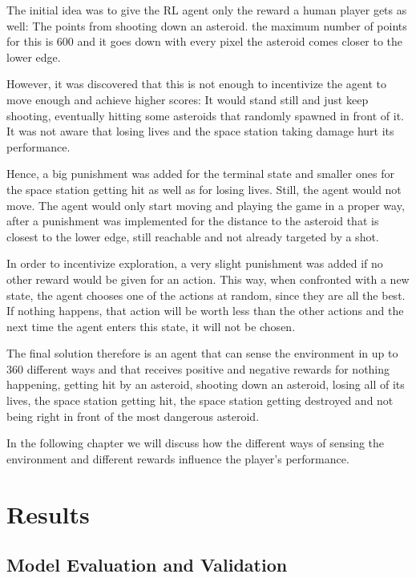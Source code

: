 \documentclass[a4paper,10pt]{article}
\begin{document}
The initial idea was to give the RL agent only the reward a human player gets as well: The points from shooting down an asteroid.
the maximum number of points for this is 600 and it goes down with every pixel the asteroid comes closer to the lower edge.

However, it was discovered that this is not enough to incentivize the agent to move enough and achieve higher scores: It would stand still and just keep shooting, eventually hitting some asteroids that randomly spawned in front of it.
It was not aware that losing lives and the space station taking damage hurt its performance.

Hence, a big punishment was added for the terminal state and smaller ones for the space station getting hit as well as for losing lives.
Still, the agent would not move.
The agent would only start moving and playing the game in a proper way, after a punishment was implemented for the distance to the asteroid that is closest to the lower edge, still reachable and not already targeted by a shot.

In order to incentivize exploration, a very slight punishment was added if no other reward would be given for an action.
This way, when confronted with a new state, the agent chooses one of the actions at random, since they are all the best.
If nothing happens, that action will be worth less than the other actions and the next time the agent enters this state, it will not be chosen.

The final solution therefore is an agent that can sense the environment in up to $360$ different ways and that receives positive and negative rewards for nothing happening, getting hit by an asteroid, shooting down an asteroid, losing all of its lives, the space station getting hit, the space station getting destroyed and not being right in front of the most dangerous asteroid.

In the following chapter we will discuss how the different ways of sensing the environment and different rewards influence the player's performance.
\section{Results}

\subsection{Model Evaluation and Validation}
\label{modeleval}
\end{document}
